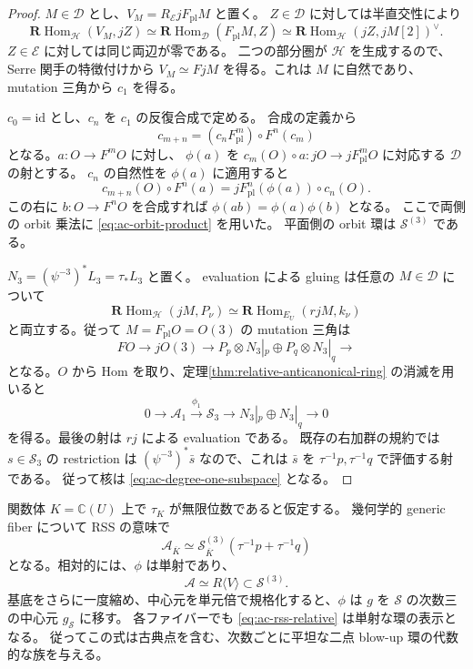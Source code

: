 \begin{proof}
$M\in\mathcal D$ とし、$V_M=R_{\mathcal E}jF_{\mathrm{pl}}M$ と置く。
$Z\in\mathcal D$ に対しては半直交性により
\[
 \mathbf R\operatorname{Hom}_{\mathcal H}(V_M,jZ)
 \simeq\mathbf R\operatorname{Hom}_{\mathcal D}(F_{\mathrm{pl}}M,Z)
 \simeq\mathbf R\operatorname{Hom}_{\mathcal H}(jZ,jM[2])^\vee.
\]
$Z\in\mathcal E$ に対しては同じ両辺が零である。
二つの部分圏が $\mathcal H$ を生成するので、Serre 関手の特徴付けから
$V_M\simeq FjM$ を得る。これは $M$ に自然であり、mutation 三角から $c_1$ を得る。

$c_0=\mathrm{id}$ とし、$c_n$ を $c_1$ の反復合成で定める。
合成の定義から
\begin{equation}\label{eq:ac-c-coherence}
 c_{m+n}=(c_nF_{\mathrm{pl}}^m)\circ F^n(c_m)
\end{equation}
となる。$a\colon O\to F^mO$ に対し、
$\phi(a)$ を $c_m(O)\circ a\colon jO\to jF_{\mathrm{pl}}^mO$ に対応する
$\mathcal D$ の射とする。
$c_n$ の自然性を $\phi(a)$ に適用すると
\[
 c_{m+n}(O)\circ F^n(a)
   =jF_{\mathrm{pl}}^n(\phi(a))\circ c_n(O).
\]
この右に $b\colon O\to F^nO$ を合成すれば
$\phi(ab)=\phi(a)\phi(b)$ となる。
ここで両側の orbit 乗法に \eqref{eq:ac-orbit-product} を用いた。
平面側の orbit 環は $\mathcal S^{(3)}$ である。

$N_3=(\psi^{-3})^*L_3=\tau_*L_3$ と置く。
evaluation による gluing は任意の $M\in\mathcal D$ について
\[
 \mathbf R\operatorname{Hom}_{\mathcal H}(jM,P_\nu)
 \simeq\mathbf R\operatorname{Hom}_{E_U}(rjM,k_\nu)
\]
と両立する。従って $M=F_{\mathrm{pl}}O=O(3)$ の mutation 三角は
\[
 FO\longrightarrow jO(3)\longrightarrow
       P_p\otimes N_3|_p\oplus P_q\otimes N_3|_q\longrightarrow
\]
となる。$O$ から Hom を取り、定理\ref{thm:relative-anticanonical-ring} の消滅を用いると
\[
 0\longrightarrow\mathscr A_1\xrightarrow{\phi_1}\mathcal S_3
 \longrightarrow N_3|_p\oplus N_3|_q\longrightarrow0
\]
を得る。最後の射は $rj$ による evaluation である。
既存の右加群の規約では $s\in\mathcal S_3$ の restriction は
$(\psi^{-3})^*\bar s$ なので、これは $\bar s$ を
$\tau^{-1}p,\tau^{-1}q$ で評価する射である。
従って核は \eqref{eq:ac-degree-one-subspace} となる。
\end{proof}

\begin{theorem}\label{thm:ac-rss-identification}
関数体 $K=\mathbb C(U)$ 上で $\tau_K$ が無限位数であると仮定する。
幾何学的 generic fiber について RSS の意味で
\begin{equation}\label{eq:ac-rss-generic}
 \mathscr A_{\overline K}
 \simeq\mathcal S_{\overline K}^{(3)}
       (\tau^{-1}p+\tau^{-1}q)
\end{equation}
となる。相対的には、$\phi$ は単射であり、
\begin{equation}\label{eq:ac-rss-relative}
                 \mathscr A\simeq R\langle V\rangle\subset\mathcal S^{(3)}.
\end{equation}
基底をさらに一度縮め、中心元を単元倍で規格化すると、$\phi$ は
$g$ を $\mathcal S$ の次数三の中心元 $g_{\mathcal S}$ に移す。
各ファイバーでも \eqref{eq:ac-rss-relative} は単射な環の表示となる。
従ってこの式は古典点を含む、次数ごとに平坦な二点 blow-up 環の代数的な族を与える。
\end{theorem}

